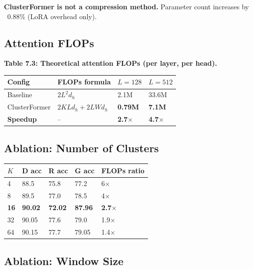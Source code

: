 \textbf{ClusterFormer is not a compression method.} Parameter count increases by 
~0.88\% (LoRA overhead only).

\subsection{Attention FLOPs}

\textbf{Table 7.3: Theoretical attention FLOPs (per layer, per head).}

\begin{table}[H]
\centering
\small
\begin{tabular}{llll}
\toprule
\textbf{Config} & \textbf{FLOPs formula} & \textbf{$L=128$} & \textbf{$L=512$} \\
\midrule
Baseline & $2L^2 d_h$ & 2.1M & 33.6M \\
ClusterFormer & $2KLd_h + 2LWd_h$ & \textbf{0.79M} & \textbf{7.1M} \\
\textbf{Speedup} & -- & \textbf{2.7$\times$} & \textbf{4.7$\times$} \\
\bottomrule
\end{tabular}
\end{table}

\subsection{Ablation: Number of Clusters}

\begin{table}[H]
\centering
\small
\begin{tabular}{lllll}
\toprule
\textbf{$K$} & \textbf{D acc} & \textbf{R acc} & \textbf{G acc} & \textbf{FLOPs ratio} \\
\midrule
4 & 88.5 & 75.8 & 77.2 & 6$\times$ \\
8 & 89.5 & 77.0 & 78.5 & 4$\times$ \\
\textbf{16} & \textbf{90.02} & \textbf{72.02} & \textbf{87.96} & \textbf{2.7$\times$} \\
32 & 90.05 & 77.6 & 79.0 & 1.9$\times$ \\
64 & 90.15 & 77.7 & 79.05 & 1.4$\times$ \\
\bottomrule
\end{tabular}
\end{table}

\subsection{Ablation: Window Size}


